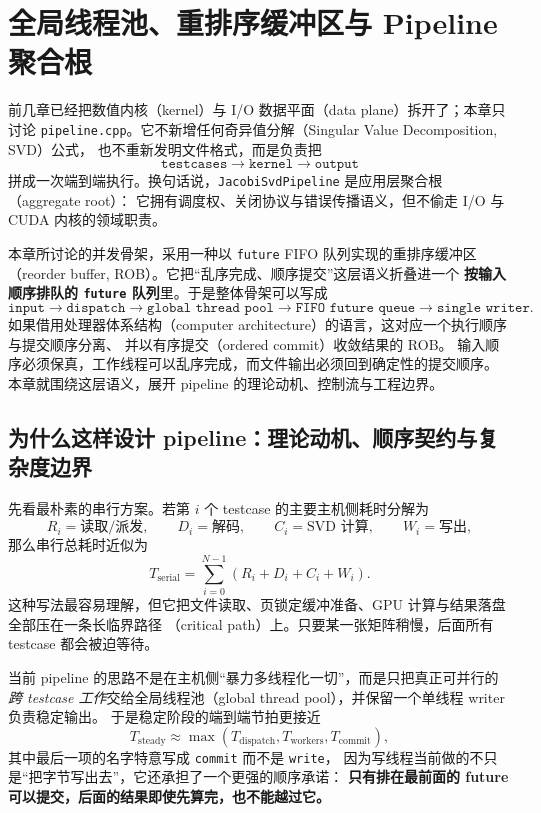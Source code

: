 \section{全局线程池、重排序缓冲区与 Pipeline 聚合根}

前几章已经把数值内核（kernel）与 I/O 数据平面（data plane）拆开了；本章只讨论
\texttt{pipeline.cpp}。它不新增任何奇异值分解（Singular Value Decomposition, SVD）公式，
也不重新发明文件格式，而是负责把
\[
    \texttt{testcases}
    \longrightarrow
    \texttt{kernel}
    \longrightarrow
    \texttt{output}
\]
拼成一次端到端执行。换句话说，\texttt{JacobiSvdPipeline} 是应用层聚合根（aggregate root）：
它拥有调度权、关闭协议与错误传播语义，但不偷走 I/O 与 CUDA 内核的领域职责。

本章所讨论的并发骨架，采用一种以 \texttt{future} FIFO 队列实现的重排序缓冲区
（reorder buffer, ROB）。它把“乱序完成、顺序提交”这层语义折叠进一个
\textbf{按输入顺序排队的 \texttt{future} 队列}里。于是整体骨架可以写成
\[
    \texttt{input}
    \longrightarrow
    \texttt{dispatch}
    \longrightarrow
    \texttt{global thread pool}
    \longrightarrow
    \texttt{FIFO future queue}
    \longrightarrow
    \texttt{single writer}.
\]
如果借用处理器体系结构（computer architecture）的语言，这对应一个执行顺序与提交顺序分离、
并以有序提交（ordered commit）收敛结果的 ROB。
输入顺序必须保真，工作线程可以乱序完成，而文件输出必须回到确定性的提交顺序。
本章就围绕这层语义，展开 pipeline 的理论动机、控制流与工程边界。

\subsection{为什么这样设计 pipeline：理论动机、顺序契约与复杂度边界}

先看最朴素的串行方案。若第 $i$ 个 testcase 的主要主机侧耗时分解为
\[
    R_i=\text{读取/派发},\qquad
    D_i=\text{解码},\qquad
    C_i=\text{SVD 计算},\qquad
    W_i=\text{写出},
\]
那么串行总耗时近似为
\[
    T_{\mathrm{serial}}
    =
    \sum_{i=0}^{N-1}(R_i+D_i+C_i+W_i).
\]
这种写法最容易理解，但它把文件读取、页锁定缓冲准备、GPU 计算与结果落盘全部压在一条长临界路径
（critical path）上。只要某一张矩阵稍慢，后面所有 testcase 都会被迫等待。

当前 pipeline 的思路不是在主机侧“暴力多线程化一切”，而是只把真正可并行的
\emph{跨 testcase 工作}交给全局线程池（global thread pool），并保留一个单线程 writer 负责稳定输出。
于是稳定阶段的端到端节拍更接近
\[
    T_{\mathrm{steady}}
    \approx
    \max(T_{\mathrm{dispatch}},T_{\mathrm{workers}},T_{\mathrm{commit}}),
\]
其中最后一项的名字特意写成 \texttt{commit} 而不是 \texttt{write}，
因为写线程当前做的不只是“把字节写出去”，它还承担了一个更强的顺序承诺：
\textbf{只有排在最前面的 future 可以提交，后面的结果即使先算完，也不能越过它。}

